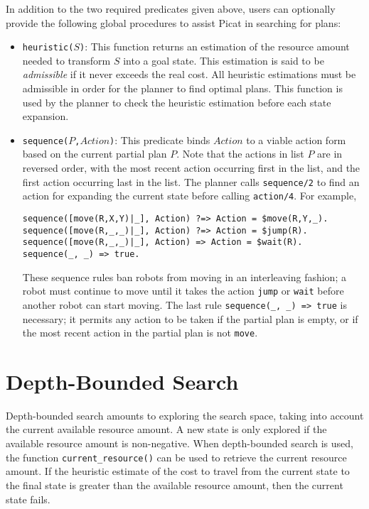 In addition to the two required predicates given above, users can optionally provide the following global procedures to assist Picat in searching for plans:
\begin{itemize}
\item \texttt{heuristic($S$)}: This function returns an estimation of the resource amount needed to transform $S$ into a goal state. This estimation is said to be \textit{admissible} if it never exceeds the real cost. All heuristic estimations must be admissible in order for the planner to find optimal plans. This function is used by the planner to check the heuristic estimation before each state expansion.

\item \texttt{sequence($P$,$Action$)}: This predicate binds $Action$ to a viable action form based on the current partial plan $P$. Note that the actions in list $P$ are in reversed order, with the most recent action occurring first in the list, and the first action occurring last in the list. The planner calls \texttt{sequence/2} to find an action for expanding the current state before calling \texttt{action/4}. For example,
\begin{verbatim}
sequence([move(R,X,Y)|_], Action) ?=> Action = $move(R,Y,_).
sequence([move(R,_,_)|_], Action) ?=> Action = $jump(R).
sequence([move(R,_,_)|_], Action) => Action = $wait(R).
sequence(_, _) => true.
\end{verbatim}
These sequence rules ban robots from moving in an interleaving fashion; a robot must continue to move until it takes the action \texttt{jump} or \texttt{wait} before another robot can start moving. The last rule \texttt{sequence(\_, \_) => true} is necessary; it permits any action to be taken if the partial plan is empty, or if the most recent action in the partial plan is not \texttt{move}.
\end{itemize}

\section{Depth-Bounded Search}
Depth-bounded search amounts to exploring the search space, taking into account the current available resource amount. A new state is only explored if the available resource amount is non-negative. When depth-bounded search is used, the function {\tt current\_resource()} can be used to retrieve the current resource amount. If the heuristic estimate of the cost to travel from the current state to the final state is greater than the available resource amount, then the current state fails.

